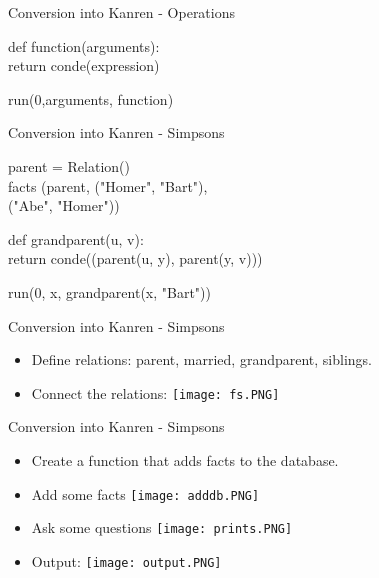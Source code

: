 \documentclass{beamer}
\begin{document}
\begin{frame}{Conversion into Kanren - Operations}
\begin{center}
    def function(\color{red}arguments\color{black}):\\
    return conde(\color{gray}expression\color{black})
\end{center}

\begin{center}
run(0,\color{red}arguments\color{black}, function)
\end{center}
\end{frame}

\begin{frame}{Conversion into Kanren - Simpsons}
\begin{center}
    parent = \color{red}Relation()\color{black}\\
    facts (parent, ("Homer", "Bart"),\\
    ("Abe", "Homer"))
\end{center}
\begin{center}
    \color{orange}def \color{black}grandparent(u, v):\\
    return conde((parent(u, y), parent(y, v)))
\end{center}



\begin{center}
    run(0, x, grandparent(x, "Bart"))
\end{center}

\end{frame}



\begin{frame}{Conversion into Kanren - Simpsons}
  \begin{itemize}
    \item{
    Define relations: parent, married, grandparent, siblings.
    }
    \item{
    Connect the relations:
      \texttt{[image: fs.PNG]}
    }
  \end{itemize}
\end{frame}

\begin{frame}{Conversion into Kanren - Simpsons}
  \begin{itemize}
    \item{
    Create a function that adds facts to the database.
    }
    \item{
    Add some facts  
      \texttt{[image: adddb.PNG]}
    }
    \item{
    Ask some questions  
      \texttt{[image: prints.PNG]}
    }
    \item{
    Output:  
      \texttt{[image: output.PNG]}
    }
  \end{itemize}
\end{frame}
\end{document}
